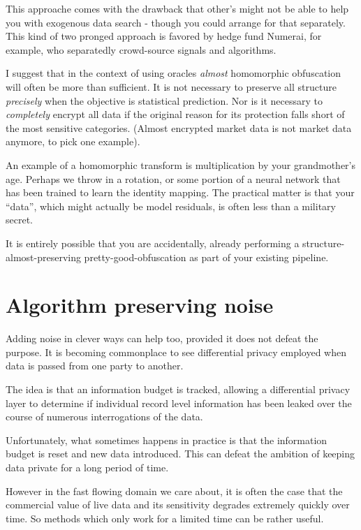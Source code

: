 This approache comes with the drawback that other's might not be able to help you with exogenous data search - though you could arrange for that separately. This kind of two pronged approach is favored by hedge fund Numerai, for example, who separatedly crowd-source signals and algorithms.     

I suggest that in the context of using oracles {\em almost} homomorphic obfuscation will often be more than sufficient. It is not necessary to preserve all structure {\em precisely} when the objective is statistical prediction. Nor is it necessary to {\em completely} encrypt all data if the original reason for its protection falls short of the most sensitive categories. (Almost encrypted market data is not market data anymore, to pick one example).  

An example of a homomorphic transform is multiplication by your grandmother's age. Perhaps we throw in a rotation, or some portion of a neural network that has been trained to learn the identity mapping. The practical matter is that your ``data'', which might actually be model residuals, is often less than a military secret. 

It is entirely possible that you are accidentally, already performing a structure-almost-preserving pretty-good-obfuscation as part of your existing pipeline. 

\section{Algorithm preserving noise}

Adding noise in clever ways can help too, provided it does not defeat the purpose. It is becoming commonplace to see differential privacy employed when data is passed from one party to another. 


The idea is that an information budget is tracked, allowing a differential privacy layer to determine if individual record level information has been leaked over the course of numerous interrogations of the data. 

Unfortunately, what sometimes happens in practice is that the information budget is reset and new data introduced. This can defeat the ambition of keeping data private for a long period of time.

However in the fast flowing domain we care about, it is often the case that the commercial value of live data and its sensitivity degrades extremely quickly over time. So methods which only work for a limited time can be rather useful. 

